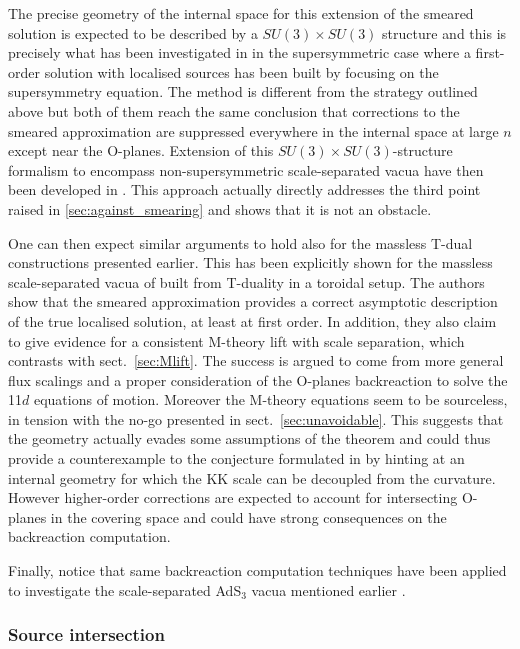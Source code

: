 \documentclass[11pt, a4paper]{article}
\begin{document}
The precise geometry of the internal space for this extension of the smeared solution is expected to be described by a $SU(3)\times SU(3)$ structure \cite{Acharya:2006ne,McOrist:2012yc,Saracco:2012wc} and this is precisely what has been investigated in \cite{Marchesano:2020qvg} in the supersymmetric case where a first-order solution with localised sources has been built by focusing on the supersymmetry equation. The method is different from the strategy outlined above but both of them reach the same conclusion that corrections to the smeared approximation are suppressed everywhere in the internal space at large $n$ except near the O-planes. Extension of this $SU(3)\times SU(3)$-structure formalism to encompass non-supersymmetric scale-separated vacua have then been developed in \cite{Marchesano:2021ycx,Marchesano:2022rpr}. This approach actually directly addresses the third point raised in \ref{sec:against_smearing} and shows that it is not an obstacle.

One can then expect similar arguments to hold also for the massless T-dual constructions presented earlier. This has been explicitly shown for the massless scale-separated vacua of \cite{Cribiori:2021djm} built from T-duality in a toroidal setup. The authors show that the smeared approximation provides a correct asymptotic description of the true localised solution, at least at first order. In addition, they also claim to give evidence for a consistent M-theory lift with scale separation, which contrasts with sect.~\ref{sec:Mlift}. The success is argued to come from more general flux scalings and a proper consideration of the O-planes backreaction to solve the 11$d$ equations of motion. Moreover the M-theory equations seem to be sourceless, in tension with the no-go presented in sect.~\ref{sec:unavoidable}. This suggests that the geometry actually evades some assumptions of the theorem and could thus provide a counterexample to the conjecture formulated in \cite{Collins:2022nux} by hinting at an internal geometry for which the KK scale can be decoupled from the curvature. However higher-order corrections are expected to account for intersecting O-planes in the covering space and could have strong consequences on the backreaction computation.

Finally, notice that same backreaction computation techniques have been applied to investigate the scale-separated AdS$_3$ vacua mentioned earlier \cite{Emelin:2021gzx}.

\subsubsection{Source intersection}
\label{sec:intersection}
\end{document}
